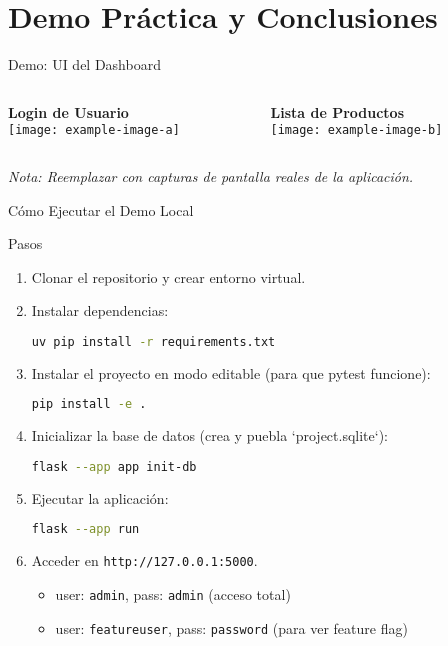 \documentclass[spanish]{beamer}
\begin{document}
\section{Demo Práctica y Conclusiones}

\begin{frame}{Demo: UI del Dashboard}
    \begin{columns}
        \begin{column}{0.5\textwidth}
            \textbf{Login de Usuario}\\
            \texttt{[image: example-image-a]}
        \end{column}
        \begin{column}{0.5\textwidth}
            \textbf{Lista de Productos}\\
            \texttt{[image: example-image-b]}
        \end{column}
    \end{columns}
    \tiny{\textit{Nota: Reemplazar con capturas de pantalla reales de la aplicación.}}
\end{frame}


\begin{frame}[fragile]{Cómo Ejecutar el Demo Local}
    \begin{block}{Pasos}
    \begin{enumerate}
        \item Clonar el repositorio y crear entorno virtual.
        \item Instalar dependencias:
        \begin{lstlisting}[language=bash]
uv pip install -r requirements.txt
        \end{lstlisting}
        \item Instalar el proyecto en modo editable (para que pytest funcione):
        \begin{lstlisting}[language=bash]
pip install -e .
        \end{lstlisting}
        \item Inicializar la base de datos (crea y puebla `project.sqlite`):
        \begin{lstlisting}[language=bash]
flask --app app init-db
        \end{lstlisting}
        \item Ejecutar la aplicación:
        \begin{lstlisting}[language=bash]
flask --app run
        \end{lstlisting}
        \item Acceder en \texttt{http://127.0.0.1:5000}.
            \begin{itemize}
                \item user: \texttt{admin}, pass: \texttt{admin} (acceso total)
                \item user: \texttt{featureuser}, pass: \texttt{password} (para ver feature flag)
            \end{itemize}
    \end{enumerate}
    \end{block}
\end{frame}
\end{document}
